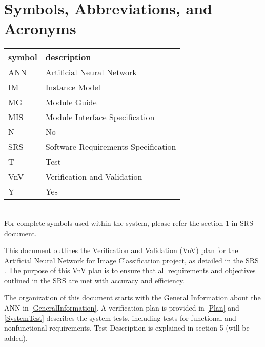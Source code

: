 \documentclass[12pt, titlepage]{article}
\begin{document}

\newpage

\section{Symbols, Abbreviations, and Acronyms}

\renewcommand{\arraystretch}{1.2}
\begin{tabular}{l l} 
  \toprule		
  \textbf{symbol} & \textbf{description}\\
  \midrule 
  ANN & Artificial Neural Network\\
  IM & Instance Model\\
  MG & Module Guide\\
  MIS & Module Interface Specification\\
  N & No \\
  SRS & Software Requirements Specification\\
  T & Test\\
  VnV & Verification and Validation\\
  Y & Yes\\

  \bottomrule
\end{tabular}\\

For complete symbols used within the system, please refer the section 1 in 
SRS \citep{SRS} document.



\newpage


This document outlines the Verification and Validation (VnV) plan for the Artificial 
Neural Network for Image Classification project, as detailed in the 
SRS \citep{SRS}. 
The purpose of this VnV plan is to ensure that all requirements and objectives outlined 
in the SRS \citep{SRS} 
are met with accuracy and efficiency.

The organization of this document starts with the General Information about the ANN in \autoref{GeneralInformation}. 
A verification plan is provided in \autoref{Plan} and \autoref{SystemTest} 
describes the system tests, including tests for functional and nonfunctional requirements. 
Test Description is explained in section 5 (will be added).
\end{document}
